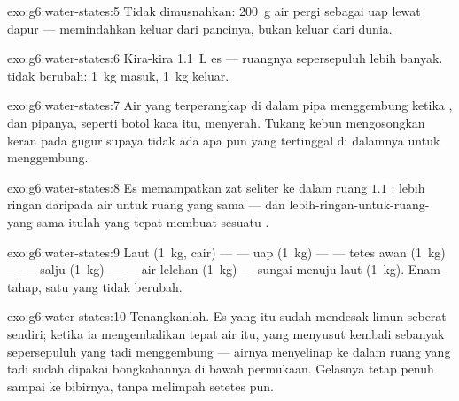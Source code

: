\begin{solution}{exo:g6:water-states:5}
Tidak dimusnahkan: \qty{200}{g} air pergi sebagai uap lewat 
dapur ---  memindahkan  keluar dari pancinya, bukan
keluar dari dunia.
\end{solution}

\begin{solution}{exo:g6:water-states:6}
Kira-kira \qty{1.1}{L} es --- ruangnya sepersepuluh lebih banyak.
 tidak berubah: \qty{1}{kg} masuk, \qty{1}{kg} keluar.
\end{solution}

\begin{solution}{exo:g6:water-states:7}
Air yang terperangkap di dalam pipa menggembung ketika , dan
pipanya, seperti botol kaca itu, menyerah. Tukang kebun mengosongkan
keran pada  gugur supaya tidak ada apa pun yang tertinggal di
dalamnya untuk menggembung.
\end{solution}

\begin{solution}{exo:g6:water-states:8}
Es memampatkan zat seliter ke dalam ruang $1.1$ : lebih ringan
daripada air untuk ruang yang sama --- dan lebih-ringan-untuk-ruang-
yang-sama itulah yang tepat membuat sesuatu .
\end{solution}

\begin{solution}{exo:g6:water-states:9}
Laut (\qty{1}{kg}, cair) ---  --- uap (\qty{1}{kg}) ---
 --- tetes awan (\qty{1}{kg}) ---  --- salju
(\qty{1}{kg}) ---  --- air lelehan (\qty{1}{kg}) --- sungai
menuju laut (\qty{1}{kg}). Enam tahap, satu  yang tidak berubah.
\end{solution}

\begin{solution}{exo:g6:water-states:10}
Tenangkanlah. Es yang  itu sudah mendesak limun seberat
\emph{} sendiri; ketika  ia mengembalikan tepat air
itu, yang menyusut kembali sebanyak sepersepuluh yang tadi
menggembung --- airnya menyelinap ke dalam ruang yang tadi sudah
dipakai bongkahannya di bawah permukaan. Gelasnya tetap penuh sampai
ke bibirnya, tanpa melimpah setetes pun.
\end{solution}

